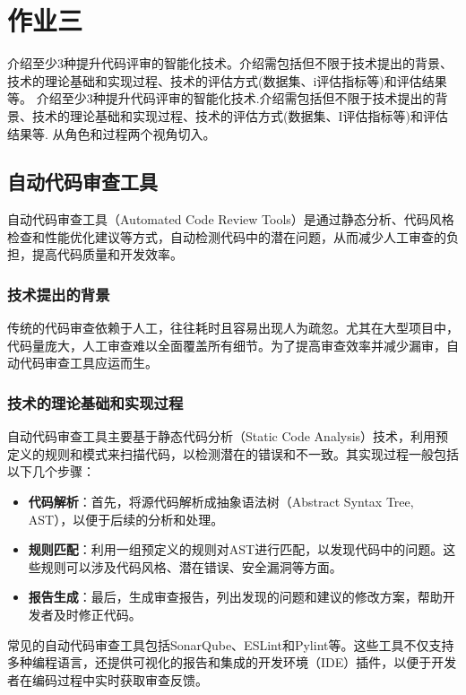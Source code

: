 \documentclass{article}
\begin{document}
\section{作业三}
介绍至少3种提升代码评审的智能化技术。介绍需包括但不限于技术提出的背景、技术的理论基础和实现过程、技术的评估方式(数据集、i评估指标等)和评估结果等。
介绍至少3种提升代码评审的智能化技术.介绍需包括但不限于技术提出的背景、技术的理论基础和实现过程、技术的评估方式(数据集、I评估指标等)和评估结果等.
从角色和过程两个视角切入。

\subsection{自动代码审查工具}

自动代码审查工具（Automated Code Review Tools）是通过静态分析、代码风格检查和性能优化建议等方式，自动检测代码中的潜在问题，从而减少人工审查的负担，提高代码质量和开发效率。

\subsubsection{技术提出的背景}

传统的代码审查依赖于人工，往往耗时且容易出现人为疏忽。尤其在大型项目中，代码量庞大，人工审查难以全面覆盖所有细节。为了提高审查效率并减少漏审，自动代码审查工具应运而生。

\subsubsection{技术的理论基础和实现过程}

自动代码审查工具主要基于静态代码分析（Static Code Analysis）技术，利用预定义的规则和模式来扫描代码，以检测潜在的错误和不一致。其实现过程一般包括以下几个步骤：

\begin{itemize}
    \item \textbf{代码解析}：首先，将源代码解析成抽象语法树（Abstract Syntax Tree, AST），以便于后续的分析和处理。
    \item \textbf{规则匹配}：利用一组预定义的规则对AST进行匹配，以发现代码中的问题。这些规则可以涉及代码风格、潜在错误、安全漏洞等方面。
    \item \textbf{报告生成}：最后，生成审查报告，列出发现的问题和建议的修改方案，帮助开发者及时修正代码。
\end{itemize}

常见的自动代码审查工具包括SonarQube、ESLint和Pylint等。这些工具不仅支持多种编程语言，还提供可视化的报告和集成的开发环境（IDE）插件，以便于开发者在编码过程中实时获取审查反馈。
\end{document}
